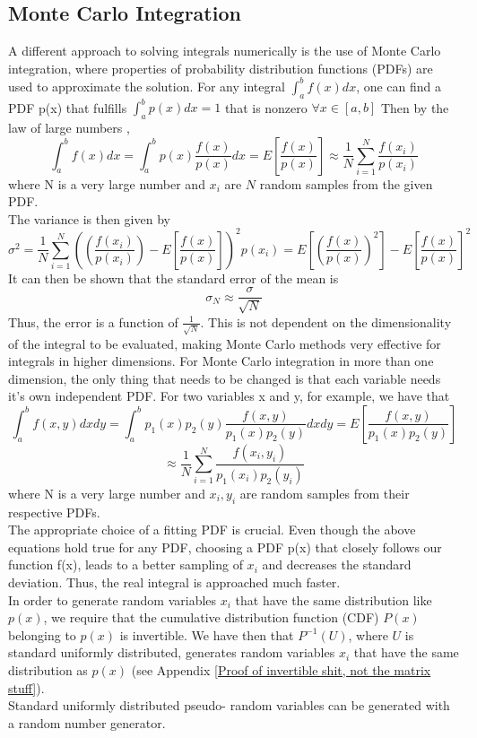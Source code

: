 \documentclass[10pt,a4paper]{article}
\begin{document}
\subsection{Monte Carlo Integration}
A different approach to solving integrals numerically is the use of Monte Carlo integration, where properties of probability distribution functions (PDFs) are used to approximate the solution. For any integral $\int_a^bf(x)dx$, one can find a PDF p(x) that fulfills  $\int_a^bp(x)dx=1$ that is nonzero $ \forall x\in [a,b]$ Then by the law of large numbers \cite{devore2012modern},
$$\int_a^bf(x)dx=\int_a^bp(x)\frac{f(x)}{p(x)}dx=E\left[\frac{f(x)}{p(x)}\right]\approx \frac{1}{N}\sum_{i=1}^{N}\frac{f(x_i)}{p(x_i)}$$
where N is a very large number and $x_i$ are $N$ random samples from the given PDF.\\
The variance is then given by
\[
\sigma^2=\frac{1}{N}\sum_{i=1}^{N}\left(\left( \frac{f(x_i)}{p(x_i)}\right)-E \left[\frac{f(x)}{p(x)} \right]\right)^2 p(x_i)=E\left[ \left( \frac{f(x)}{p(x)}\right)^2\right]-E\left[\frac{f(x)}{p(x)}\right]^2
\]
It can then be shown \cite{devore2012modern} that the standard error of the mean is
$$
\sigma_N \approx \frac{\sigma}{\sqrt{N}}
$$
Thus, the error is a function of $\frac{1}{\sqrt{N}}$. This is not dependent on the dimensionality of the integral to be evaluated, making Monte Carlo methods very effective for integrals in higher dimensions.
For Monte Carlo integration in more than one dimension, the only thing that needs to be changed is that each variable needs it's own independent PDF. For two variables x and y, for example, we have that 
$$\int_a^bf(x,y)dxdy=\int_a^bp_1(x)p_2(y)\frac{f(x,y)}{p_1(x)p_2(y)}dxdy=E\left[\frac{f(x,y)}{p_1(x)p_2(y)}\right]$$
$$\approx \frac{1}{N}\sum_{i=1}^{N}\frac{f(x_i,y_i)}{p_1(x_i)p_2(y_i)}$$
where N is a very large number and $x_i, y_i$ are random samples from their respective PDFs.\\
The appropriate choice of a fitting PDF is crucial. Even though the above equations hold true for any PDF, choosing a PDF p(x) that closely follows our function f(x), leads to a better sampling of $x_i$ \cite{devore2012modern} and decreases the standard deviation. Thus, the real integral is approached much faster.\\
In order to generate random variables $x_i$ that have the same distribution like $p(x)$, we require that the cumulative distribution function (CDF) $P(x)$ belonging to $p(x)$ is invertible. We have then that $P^{-1}(U)$, where $U$ is standard uniformly distributed, generates random variables $x_i$ that have the same distribution as $p(x)$ (see Appendix \ref{Proof of invertible shit, not the matrix stuff}).\\
Standard uniformly distributed pseudo- random variables can be generated with a random number generator. 
\end{document}
